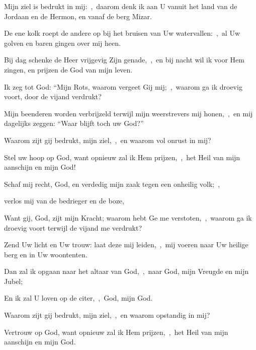 \documentclass[12pt,twoside,a5paper]{article}
\begin{document}

\begin{halfparskip}
  Mijn ziel is bedrukt in mij:~\sep\ daarom denk ik aan U vanuit het land van de Jordaan en de Hermon, en vanaf de berg Mizar.

  De ene kolk roept de andere op bij het bruisen van Uw watervallen:~\sep\ al Uw golven en baren gingen over mij heen.

  Bij dag schenke de Heer vrijgevig Zijn genade,~\sep\ en bij nacht wil ik voor Hem zingen, en prijzen de God van mijn leven.

  Ik zeg tot God: ``Mijn Rots, waarom vergeet Gij mij;~\sep\ waarom ga ik droevig voort, door de vijand verdrukt?

  Mijn beenderen worden verbrijzeld terwijl mijn weerstrevers mij honen,~\sep\ en mij dagelijks zeggen: ``Waar blijft toch uw God?''

  Waarom zijt gij bedrukt, mijn ziel,~\sep\ en waarom vol onrust in mij?

  Stel uw hoop op God, want opnieuw zal ik Hem prijzen,~\sep\ het Heil van mijn aanschijn en mijn God!
\end{halfparskip}



\begin{halfparskip}
  Schaf mij recht, God, en verdedig mijn zaak tegen een onheilig volk;~\sep


  verlos mij van de bedrieger en de boze,

  Want gij, God, zijt mijn Kracht; waarom hebt Ge me verstoten,~\sep\ waarom ga ik droevig voort terwijl de vijand me verdrukt?
\end{halfparskip}


\begin{halfparskip}
  Zend Uw licht en Uw trouw: laat deze mij leiden,~\sep\ mij voeren naar Uw heilige berg en in Uw woontenten.

  Dan zal ik opgaan naar het altaar van God,~\sep\ naar God, mijn Vreugde en mijn Jubel;

  En ik zal U loven op de citer,~\sep\ God, mijn God.

  Waarom zijt gij bedrukt, mijn ziel,~\sep\ en waarom opstandig in mij?

  Vertrouw op God, want opnieuw zal ik Hem prijzen,~\sep\ het Heil van mijn aanschijn en mijn God.
\end{halfparskip}
\end{document}

